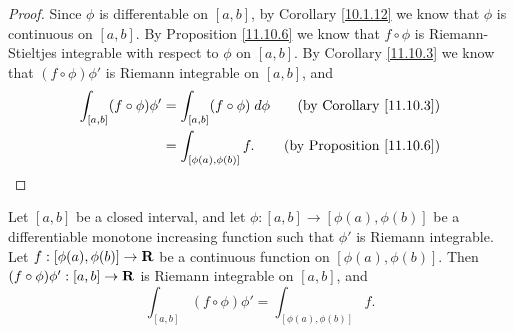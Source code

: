 \begin{proof}
    Since \(\phi\) is differentable on \([a, b]\), by Corollary \ref{10.1.12} we know that \(\phi\) is continuous on \([a, b]\).
    By Proposition \ref{11.10.6} we know that \(f \circ \phi\) is Riemann-Stieltjes integrable with respect to \(\phi\) on \([a, b]\).
    By Corollary \ref{11.10.3} we know that \((f \circ \phi) \phi'\) is Riemann integrable on \([a, b]\), and
    \begin{align*}
        \int_{[a, b]} (f \circ \phi) \phi' & = \int_{[a, b]} (f \circ \phi) \; d \phi & \text{(by Corollary \ref{11.10.3})}   \\
                                           & = \int_{[\phi(a), \phi(b)]} f.           & \text{(by Proposition \ref{11.10.6})}
    \end{align*}
\end{proof}

\begin{additional corollary}\label{ac 11.10.1}
Let \([a, b]\) be a closed interval, and let \(\phi : [a, b] \to [\phi(a), \phi(b)]\) be a differentiable monotone increasing function such that \(\phi'\) is Riemann integrable.
Let \(f : [\phi(a), \phi(b)] \to \mathbf{R}\) be a continuous function on \([\phi(a), \phi(b)]\).
Then \((f \circ \phi) \phi' : [a, b] \to \mathbf{R}\) is Riemann integrable on \([a, b]\), and
\[
    \int_{[a, b]} (f \circ \phi) \phi' = \int_{[\phi(a), \phi(b)]} f.
\]
\end{additional corollary}

